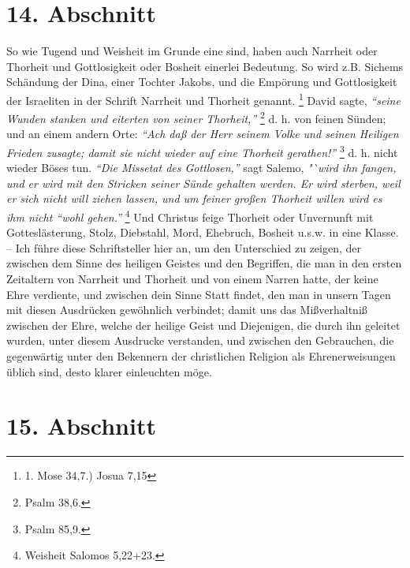 \section{14. Abschnitt} \label{kap9_ab14}

So wie Tugend und Weisheit im Grunde eine sind, haben auch Narrheit oder
Thorheit und Gottlosigkeit oder Bosheit einerlei Bedeutung. So wird z.B.
Sichems Schändung der Dina, einer
Tochter Jakobs, und die Empörung und
Gottlosigkeit der Israeliten in der Schrift Narrheit
und Thorheit
genannt.
\footnote{1. Mose 34,7.) Josua 7,15}
David sagte,
\textit{"`seine Wunden stanken
und eiterten von seiner Thorheit,"'}
\footnote{Psalm 38,6.}
d. h. von feinen Sünden;
und an einem andern Orte:
\textit{"`Ach daß der Herr seinem Volke und seinen Heiligen
Frieden zusagte; damit sie nicht wieder auf eine Thorheit
gerathen!"'}
\footnote{Psalm 85,9.}
d. h. nicht wieder Böses tun.
\textit{"`Die Missetat des Gottlosen,"'}
sagt Salemo,
\textit{"`wird ihn fangen, und er wird mit den Stricken
seiner Sünde gehalten werden. Er wird sterben, weil er sich nicht
will ziehen
lassen, und um feiner großen Thorheit willen wird es ihm nicht "`wohl
gehen."'}
\footnote{Weisheit Salomos 5,22+23.}
Und Christus feige Thorheit oder
Unvernunft mit Gotteslästerung, Stolz, Diebstahl, Mord, Ehebruch, Bosheit u.s.w.
in eine Klasse. -- Ich führe diese Schriftsteller hier an, um den
Unterschied zu zeigen, der zwischen dem Sinne des heiligen Geistes und den
Begriffen, die man in den ersten Zeitaltern von Narrheit und Thorheit und von
einem Narren hatte, der keine Ehre verdiente, und zwischen dein Sinne Statt
findet, den man in unsern Tagen mit diesen Ausdrücken gewöhnlich verbindet;
damit uns das Mißverhaltniß zwischen der Ehre, welche der heilige Geist und
Diejenigen, die durch ihn geleitet wurden, unter diesem Ausdrucke verstanden,
und zwischen den Gebrauchen, die gegenwärtig unter den Bekennern der
christlichen Religion als Ehrenerweisungen üblich sind, desto klarer einleuchten
möge.

\section{15. Abschnitt} \label{kap9_ab15}

